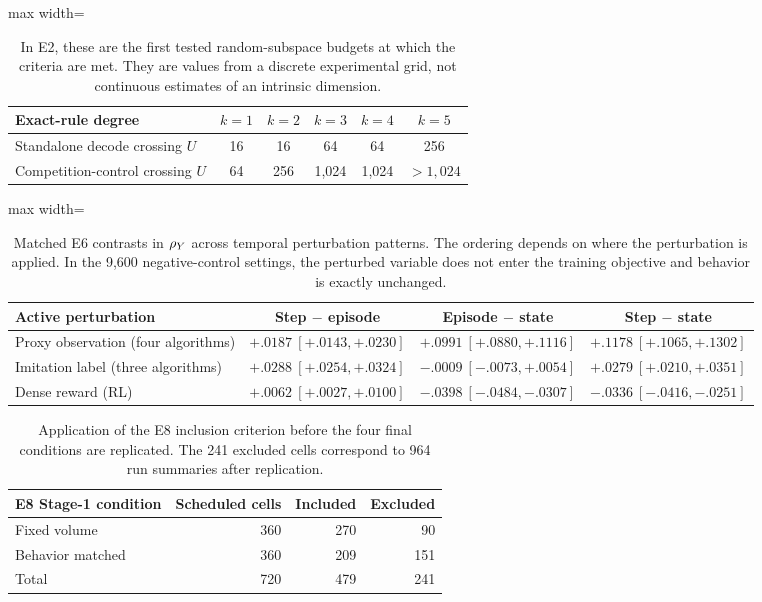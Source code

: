\begin{table}[!htbp]
\centering
\small
\begin{adjustbox}{max width=\linewidth}
\begin{tabular}{lccccc}
\toprule
Exact-rule degree & $k=1$ & $k=2$ & $k=3$ & $k=4$ & $k=5$ \\
\midrule
Standalone decode crossing $U$ & 16 & 16 & 64 & 64 & 256 \\
Competition-control crossing $U$ & 64 & 256 & 1,024 & 1,024 & $>1,024$ \\
\bottomrule
\end{tabular}
\end{adjustbox}
\caption{In E2, these are the first tested random-subspace budgets at which the criteria are met. They are values from a discrete experimental grid, not continuous estimates of an intrinsic dimension.}
\label{tab:lw-decode-thresholds}
\end{table}

\begin{table}[!htbp]
\centering
\small
\begin{adjustbox}{max width=\linewidth}
\begin{tabular}{lccc}
\toprule
Active perturbation & Step $-$ episode & Episode $-$ state & Step $-$ state \\
\midrule
Proxy observation (four algorithms) & $+.0187\ [+.0143,+.0230]$ & $+.0991\ [+.0880,+.1116]$ & $+.1178\ [+.1065,+.1302]$ \\
Imitation label (three algorithms) & $+.0288\ [+.0254,+.0324]$ & $-.0009\ [-.0073,+.0054]$ & $+.0279\ [+.0210,+.0351]$ \\
Dense reward (RL) & $+.0062\ [+.0027,+.0100]$ & $-.0398\ [-.0484,-.0307]$ & $-.0336\ [-.0416,-.0251]$ \\
\bottomrule
\end{tabular}
\end{adjustbox}
\caption{Matched E6 contrasts in $\rho_Y$ across temporal perturbation patterns. The ordering depends on where the perturbation is applied. In the 9,600 negative-control settings, the perturbed variable does not enter the training objective and behavior is exactly unchanged.}
\label{tab:lw-noise-locations}
\end{table}

\begin{table}[!htbp]
\centering
\small
\begin{tabular}{lrrr}
\toprule
E8 Stage-1 condition & Scheduled cells & Included & Excluded \\
\midrule
Fixed volume & 360 & 270 & 90 \\
Behavior matched & 360 & 209 & 151 \\
\midrule
Total & 720 & 479 & 241 \\
\bottomrule
\end{tabular}
\caption{Application of the E8 inclusion criterion before the four final conditions are replicated. The 241 excluded cells correspond to 964 run summaries after replication.}
\label{tab:lw-e8-eligibility}
\end{table}

